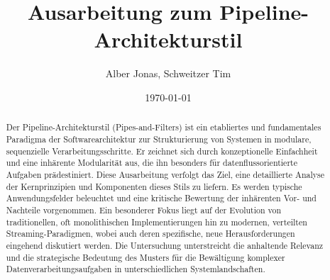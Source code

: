 \documentclass[10pt]{article}
\title{Ausarbeitung zum Pipeline-Architekturstil}
\author{Alber Jonas, Schweitzer Tim}
\date{\today}
\begin{document}
\maketitle

\begin{abstract}
Der Pipeline-Architekturstil (Pipes-and-Filters) ist ein etabliertes und fundamentales Paradigma der Softwarearchitektur zur Strukturierung von Systemen in modulare, sequenzielle Verarbeitungsschritte. Er zeichnet sich durch konzeptionelle Einfachheit und eine inhärente Modularität aus, die ihn besonders für datenflussorientierte Aufgaben prädestiniert.\cite{richards2020} Diese Ausarbeitung verfolgt das Ziel, eine detaillierte Analyse der Kernprinzipien und Komponenten dieses Stils zu liefern. Es werden typische Anwendungsfelder beleuchtet und eine kritische Bewertung der inhärenten Vor- und Nachteile vorgenommen. Ein besonderer Fokus liegt auf der Evolution von traditionellen, oft monolithischen Implementierungen hin zu modernen, verteilten Streaming-Paradigmen, wobei auch deren spezifische, neue Herausforderungen eingehend diskutiert werden. Die Untersuchung unterstreicht die anhaltende Relevanz und die strategische Bedeutung des Musters für die Bewältigung komplexer Datenverarbeitungsaufgaben in unterschiedlichen Systemlandschaften.
\end{abstract}
\end{document}
